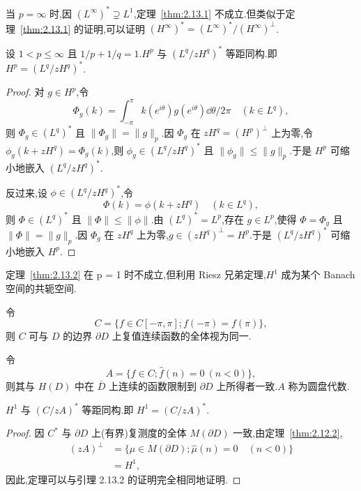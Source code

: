 当 $p = \infty$ 时,因 $(L^{\infty})^{*} \supsetneq L^{1}$,定理~\ref{thm:2.13.1} 不成立.但类似于定理~\ref{thm:2.13.1} 的证明,可以证明 $(H^{\infty})^{*} = (L^{\infty})^{*} / (H^{\infty})^{\perp}$.

\begin{theorem}\label{thm:2.13.2}
设 $1 < p \leq \infty$ 且 $1/p + 1/q = 1$.$H^{p}$ 与 $(L^{q}/zH^{q})^{*}$ 等距同构.即 $H^{p} = (L^{q}/zH^{q})^{*}$.
\end{theorem}

\begin{proof}
对 $g \in H^{p}$,令
\begin{equation*}
\Phi_{g}(k) = \int_{-\pi}^{\pi} k(e^{i\theta}) g(e^{i\theta})\dd \theta / 2\pi \quad (k \in L^{q}),
\end{equation*}
则 $\Phi_{g} \in (L^{q})^{*}$ 且 $\|\Phi_{g}\| = \|g\|_{p}$.因 $\Phi_{g}$ 在 $zH^{q} = (H^{p})^{\perp}$ 上为零,令 $\phi_{g}(k + zH^{q}) = \Phi_{g}(k)$,则 $\phi_{g} \in (L^{q}/zH^{q})^{*}$ 且 $\|\phi_{g}\| \leq \|g\|_{p}$.于是 $H^{p}$ 可缩小地嵌入 $(L^{q}/zH^{q})^{*}$.

反过来,设 $\phi \in (L^{q}/zH^{q})^{*}$,令
\begin{equation*}
\Phi(k) = \phi(k + zH^{q}) \quad (k \in L^{q}),
\end{equation*}
则 $\Phi \in (L^{q})^{*}$ 且 $\|\Phi\| \leq \|\phi\|$.由 $(L^{q})^{*} = L^{p}$,存在 $g \in L^{p}$,使得 $\Phi = \Phi_{g}$ 且 $\|\Phi\| = \|g\|_{p}$.因 $\Phi_{g}$ 在 $zH^{q}$ 上为零,$g \in (zH^{q})^{\perp} = H^{p}$.于是 $(L^{q}/zH^{q})^{*}$ 可缩小地嵌入 $H^{p}$.
\end{proof}

定理~\ref{thm:2.13.2} 在 p = 1 时不成立,但利用 Riesz 兄弟定理,$H^{1}$ 成为某个 Banach 空间的共轭空间.

令
\begin{equation*}
C = \{f \in C[-\pi, \pi]; f(-\pi) = f(\pi)\},
\end{equation*}
则 $C$ 可与 $D$ 的边界 $\partial D$ 上复值连续函数的全体视为同一.

令
\begin{equation*}
A = \{f \in C; \hat{f}(n) = 0 \ (n < 0)\},
\end{equation*}
则其与 $H(D)$ 中在 $\overline{D}$ 上连续的函数限制到 $\partial D$ 上所得者一致.$A$ 称为圆盘代数.

\begin{theorem}\label{thm:2.13.3}
$H^{1}$ 与 $(C/zA)^{*}$ 等距同构.即 $H^{1} = (C/zA)^{*}$.
\end{theorem}

\begin{proof}
因 $C^{*}$ 与 $\partial D$ 上(有界)复测度的全体 $M(\partial D)$ 一致,由定理~\ref{thm:2.12.2},
\begin{align*}
(zA)^{\perp} & = \{\mu \in M(\partial D); \hat{\mu}(n) = 0 \quad (n < 0)\} \\
& = H^{1},
\end{align*}
因此,定理可以与引理 2.13.2 的证明完全相同地证明.
\end{proof}
